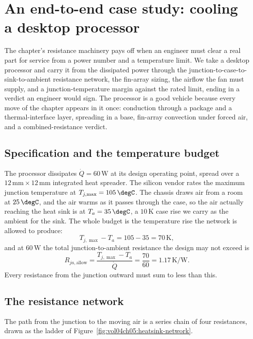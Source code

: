 \section{An end-to-end case study: cooling a desktop
processor}

The chapter's resistance machinery pays off when an engineer must clear
a real part for service from a power number and a temperature limit. We
take a desktop processor and carry it from the dissipated power through
the junction-to-case-to-sink-to-ambient resistance network, the fin-array
sizing, the airflow the fan must supply, and a junction-temperature
margin against the rated limit, ending in a verdict an engineer would
sign. The processor is a good vehicle because every move of the chapter
appears in it once: conduction through a package and a thermal-interface
layer, spreading in a base, fin-array convection under forced air, and a
combined-resistance verdict.

\subsection{Specification and the temperature budget}

The processor dissipates $\dot{Q} = 60\,\text{W}$ at its design
operating point, spread over a $12\,\si{\milli\meter} \times 12\,\si{
\milli\meter}$ integrated heat spreader. The silicon vendor rates the
maximum junction temperature at $T_{j,\max} = 105\,\degC$. The chassis
draws air from a room at $25\,\degC$, and the air warms as it passes
through the case, so the air actually reaching the heat sink is at
$T_a = 35\,\degC$, a $10\,\si{\kelvin}$ case rise we carry as the
ambient for the sink. The whole budget is the temperature rise the
network is allowed to produce:
\[
T_{j,\max} - T_a = 105 - 35 = 70\,\si{\kelvin},
\]
and at $60\,\text{W}$ the total junction-to-ambient resistance the
design may not exceed is
\[
R_{ja,\text{allow}} = \frac{T_{j,\max} - T_a}{\dot{Q}} = \frac{70}{60}
= 1.17\,\si{\kelvin}/\text{W}.
\]
Every resistance from the junction outward must sum to less than this.

\subsection{The resistance network}

The path from the junction to the moving air is a series chain of four
resistances, drawn as the ladder of
Figure~\ref{fig:vol04ch05:heatsink-network}.

